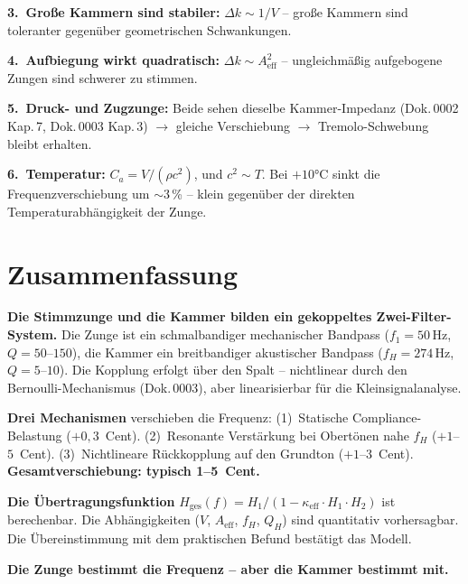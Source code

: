 \documentclass[11pt,a4paper]{article}
\begin{document}
\textbf{3.\ Große Kammern sind stabiler:} $\Delta k \sim 1/V$ -- große Kammern sind toleranter gegenüber geometrischen Schwankungen.

\textbf{4.\ Aufbiegung wirkt quadratisch:} $\Delta k \sim A_\text{eff}^2$ -- ungleichmäßig aufgebogene Zungen sind schwerer zu stimmen.

\textbf{5.\ Druck- und Zugzunge:} Beide sehen dieselbe Kammer-Impedanz (Dok.\,0002 Kap.\,7, Dok.\,0003 Kap.\,3) $\to$ gleiche Verschiebung $\to$ Tremolo-Schwebung bleibt erhalten.

\textbf{6.\ Temperatur:} $C_a = V/(\rho c^2)$, und $c^2 \sim T$. Bei $+10$°C sinkt die Frequenzverschiebung um $\sim$3\,\% -- klein gegenüber der direkten Temperaturabhängigkeit der Zunge.

\section{Zusammenfassung}

\begin{keybox}
\textbf{Die Stimmzunge und die Kammer bilden ein gekoppeltes Zwei-Filter-System.} Die Zunge ist ein schmalbandiger mechanischer Bandpass ($f_1 = 50$\,Hz, $Q = 50$--$150$), die Kammer ein breitbandiger akustischer Bandpass ($f_H = 274$\,Hz, $Q = 5$--$10$). Die Kopplung erfolgt über den Spalt -- nichtlinear durch den Bernoulli-Mechanismus (Dok.\,0003), aber linearisierbar für die Kleinsignalanalyse.

\textbf{Drei Mechanismen} verschieben die Frequenz: (1)~Statische Compliance-Belastung ($+0{,}3$~Cent). (2)~Resonante Verstärkung bei Obertönen nahe $f_H$ ($+1$--$5$~Cent). (3)~Nichtlineare Rückkopplung auf den Grundton ($+1$--$3$~Cent). \textbf{Gesamtverschiebung: typisch 1--5~Cent.}

\textbf{Die Übertragungsfunktion} $H_\text{ges}(f) = H_1/(1 - \kappa_\text{eff} \cdot H_1 \cdot H_2)$ ist berechenbar. Die Abhängigkeiten ($V$, $A_\text{eff}$, $f_H$, $Q_H$) sind quantitativ vorhersagbar. Die Übereinstimmung mit dem praktischen Befund bestätigt das Modell.

\textbf{Die Zunge bestimmt die Frequenz -- aber die Kammer bestimmt mit.}
\end{keybox}
\end{document}
